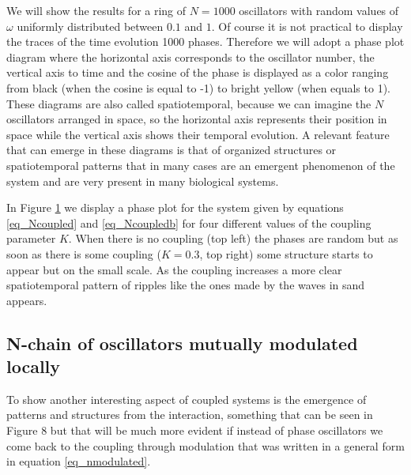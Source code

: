 \documentclass{article}
\begin{document}
\begin{figure} [h]
    \centerline{}
    \caption{}
    \label{fig_noscoupled}
\end{figure}


We will show the results for a ring of $N=1000$ oscillators with random values of $\omega$ uniformly distributed between $0.1$ and $1$. Of course it is not practical to display the traces of the time evolution 1000 phases. 
Therefore we will adopt a phase plot diagram where the horizontal axis corresponds to the oscillator number, the vertical axis to time and the cosine of the phase is displayed as a color ranging from black (when the cosine is equal to -1) to bright yellow (when equals to 1). 
These diagrams are also called spatiotemporal, because we can imagine the $N$ oscillators arranged in space, so the horizontal axis represents their position in space while the vertical axis shows their temporal evolution. 
A relevant feature that can emerge in these diagrams is that of organized structures or spatiotemporal patterns that in many cases are an emergent phenomenon of the system and are very present in many biological systems.

In Figure \ref{fig_noscoupled} we display a phase plot for the system given by equations \ref{eq_Ncoupled} and \ref{eq_Ncoupledb} for four different values of the coupling parameter $K$. 
When there is no coupling (top left) the phases are random but as soon as there is some coupling ($K=0.3$, top right) some structure starts to appear but on the small scale. As the coupling increases a more clear spatiotemporal pattern of ripples like the ones made by the waves in sand appears. 



\subsection{N-chain of oscillators mutually modulated locally}

To show another interesting aspect of coupled systems is the emergence of patterns and structures from the interaction, something that can be seen in Figure 8 but that will be much more evident if instead of phase oscillators we come back to the coupling through modulation that was written in a general form in equation \ref{eq_nmodulated}.
\end{document}
